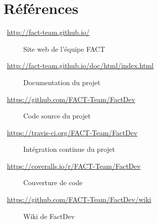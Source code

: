 \chapter{Références}
\begin{description}
	\item[\Mundus~\url{http://fact-team.github.io/}] Site web de l'équipe FACT
	\item[\Mundus~\url{http://fact-team.github.io/doc/html/index.html}] Documentation  du projet
	\item[\Mundus~\url{https://github.com/FACT-Team/FactDev}] Code source du projet
	\item[\Mundus~\url{https://travis-ci.org/FACT-Team/FactDev}] Intégration continue du projet
	\item[\Mundus~\url{https://coveralls.io/r/FACT-Team/FactDev}] Couverture de code
	\item[\Mundus~\url{https://github.com/FACT-Team/FactDev/wiki}] Wiki de FactDev
\end{description}
